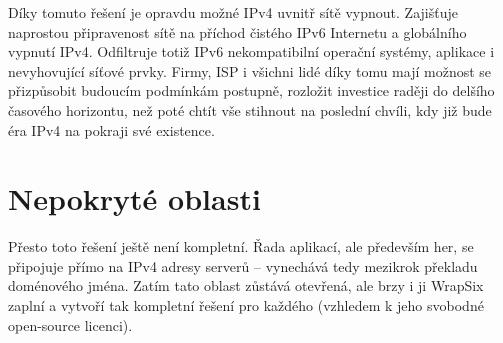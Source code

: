 \documentclass[12pt]{report}
\begin{document}
Díky tomuto řešení je opravdu možné IPv4 uvnitř sítě vypnout. Zajišťuje naprostou připravenost sítě na příchod čistého IPv6 Internetu a globálního vypnutí IPv4. Odfiltruje totiž IPv6 nekompatibilní operační systémy, aplikace i nevyhovující síťové prvky. Firmy, ISP i všichni lidé díky tomu mají možnost se přizpůsobit budoucím podmínkám postupně, rozložit investice raději do delšího časového horizontu, než poté chtít vše stihnout na poslední chvíli, kdy již bude éra IPv4 na pokraji své existence.

\section{Nepokryté oblasti}
Přesto toto řešení ještě není kompletní. Řada aplikací, ale především her, se připojuje přímo na IPv4 adresy serverů -- vynechává tedy mezikrok překladu doménového jména. Zatím tato oblast zůstává otevřená, ale brzy i ji WrapSix zaplní a vytvoří tak kompletní řešení pro každého (vzhledem k jeho svobodné open-source licenci).
\newpage{}
\end{document}
